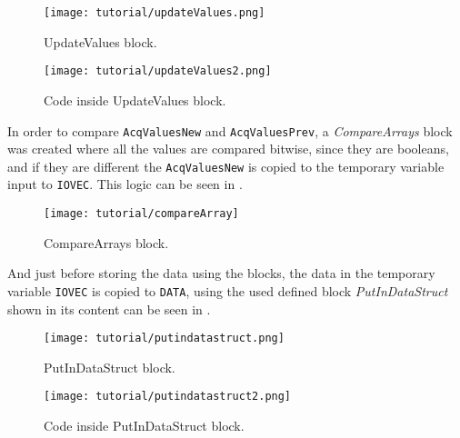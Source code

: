 \begin{figure}[H] \centering
 \texttt{[image: tutorial/updateValues.png]}
  \caption{UpdateValues block.}
  \label{fig:updateValuesBlock}
\end{figure}

\begin{figure}[H] \centering
 \texttt{[image: tutorial/updateValues2.png]}
  \caption{Code inside UpdateValues block.}
  \label{fig:updateValuesBlockCode}
\end{figure}

In order to compare \verb|AcqValuesNew| and \verb|AcqValuesPrev|, a
\emph{CompareArrays} block was created where all the values are compared
bitwise, since they are booleans, and if they are different the
\verb|AcqValuesNew| is copied to the temporary variable input to \verb|IOVEC|.
This logic can be seen in .

\begin{figure}[H] \centering
 \texttt{[image: tutorial/compareArray]}
  \caption{CompareArrays block.}
  \label{fig:compareArrayBlock}
\end{figure}

And just before storing the data using the blocks, the data in the temporary
variable \verb|IOVEC| is copied to \verb|DATA|, using the used defined block
\emph{PutInDataStruct} shown in  its content
can be seen in .  

\begin{figure}[H] \centering
 \texttt{[image: tutorial/putindatastruct.png]}
  \caption{PutInDataStruct block.}
  \label{fig:putInDataStructBlock}
\end{figure}

\begin{figure}[H] \centering
 \texttt{[image: tutorial/putindatastruct2.png]}
  \caption{Code inside PutInDataStruct block.}
  \label{fig:putInDataStructBlockCode}
\end{figure}

